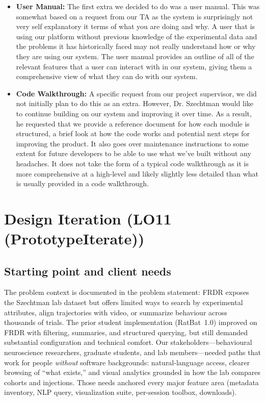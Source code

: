 \documentclass{article}
\begin{document}
\begin{itemize}

    \item{\textbf{User Manual: }The first extra we decided to do was a user manual. This was somewhat based on a request from our TA as the system is surprisingly
    not very self explanatory it terms of what you are doing and why. A user that is using our platform without previous knowledge of the experimental data and the problems
    it has historically faced may not really understand how or why they are using our system. The user manual provides an outline of all of the relevant features that a user
    can interact with in our system, giving them a comprehensive view of what they can do with our system.}
    \item{\textbf{Code Walkthrough:} A specific request from our project supervisor, we did not initially plan to do this as an extra. However, Dr. Szechtman would like to continue building
    on our system and improving it over time. As a result, he requested that we provide a reference document for how each module is structured, a brief look at how the code works and potential next steps for
    improving the product. It also goes over maintenance instructions to some extent for future developers to be able to use what we've built without any headaches. It does not take the form of a 
    typical code walkthrough as it is more comprehensive at a high-level and likely slightly less detailed than what is usually provided in a code walkthrough.}
\end{itemize}
\section{Design Iteration (LO11 (PrototypeIterate))}



\subsection{Starting point and client needs}

\par{The problem context is documented in the problem statement: FRDR exposes the Szechtman lab dataset but offers limited ways to search by experimental attributes, align trajectories with video, or summarize behaviour across thousands of trials. The prior student implementation (RatBat~1.0) improved on FRDR with filtering, summaries, and structured querying, but still demanded substantial configuration and technical comfort. Our stakeholders---behavioural neuroscience researchers, graduate students, and lab members---needed paths that work for people \emph{without} software backgrounds: natural-language access, clearer browsing of ``what exists,'' and visual analytics grounded in how the lab compares cohorts and injections. Those needs anchored every major feature area (metadata inventory, NLP query, visualization suite, per-session toolbox, downloads).}
\end{document}
